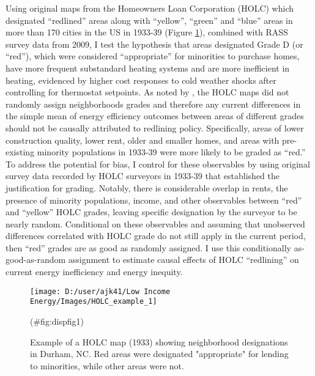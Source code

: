 \documentclass[
]{article}
\begin{document}
Using original maps from the Homeowners Loan Corporation (HOLC) which designated ``redlined'' areas along with ``yellow'', ``green'' and ``blue'' areas
in more than 170 cities in the US in 1933-39 (Figure \ref{fig:HOLC1}),
combined with RASS survey data from 2009, I test the hypothesis that areas designated Grade D (or ``red''), which were considered ``appropriate'' for minorities to purchase homes, have more frequent substandard heating systems and are more inefficient in heating, evidenced by higher cost responses to cold weather shocks after controlling
for thermostat setpoints. As noted by \citet{Fishback2020}, the HOLC maps did not randomly assign neighborhoods grades and therefore any current differences in
the simple mean of energy efficiency outcomes between areas of different grades should not be causally attributed to redlining policy. Specifically, areas of lower construction quality, lower rent, older and smaller homes, and areas with pre-existing minority populations in 1933-39 were more likely to be graded as ``red.'' To address
the potential for bias, I control for these observables by using original survey data recorded by HOLC surveyors in 1933-39 that established the
justification for grading. Notably, there is considerable overlap in rents, the presence of minority populations, income, and other observables between ``red'' and ``yellow''
HOLC grades, leaving specific designation by the surveyor to be nearly random. Conditional on these observables and assuming that
unobserved differences correlated with HOLC grade do not still apply in the current period, then
``red'' grades are as good as randomly assigned. I use this conditionally as-good-as-random assignment to estimate causal effects of HOLC ``redlining'' on current
energy inefficiency and energy inequity.

\begin{figure}

{\centering \texttt{[image: D:/user/ajk41/Low Income Energy/Images/HOLC\_example\_1]} 

}

\caption{Example of a HOLC map (1933) showing neighborhood designations in Durham, NC. Red areas were designated "appropriate" for lending to minorities, while other areas were not. \label{fig:HOLC1}}(\#fig:dispfig1)
\end{figure}
\end{document}
